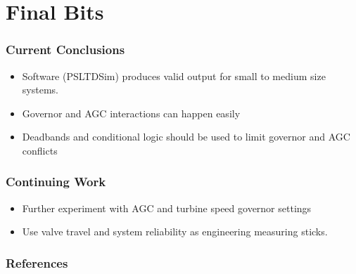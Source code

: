 \documentclass[14pt, unknownkeysallowed]{beamer}
\begin{document}
\section{Final Bits}
\begin{frame}
\frametitle{Current Conclusions}
\begin{itemize}
	\item Software (PSLTDSim) produces valid output for small to medium size systems.
	\item Governor and AGC interactions can happen easily
	\item Deadbands and conditional logic should be used to limit governor and AGC conflicts
\end{itemize}
\end{frame}
\begin{frame}
\frametitle{Continuing Work}
\begin{itemize}
\item Further experiment with AGC and turbine speed governor settings
\item Use valve travel and system reliability as engineering measuring sticks.
\end{itemize}
\end{frame}

\begin{frame}
\end{frame}

\begin{frame}[allowframebreaks]
\frametitle{References}
\renewcommand*{\bibfont}{\scriptsize} %
\printbibliography
\end{frame}



\begin{comment}
\frametitle{And why?}
\begin{itemize}
\item Simplification
\item Facilitate other research
\end{itemize}
\end{frame}
\begin{frame}
\frametitle{Engineering Areas of Interest}
\end{comment}
\end{document}
